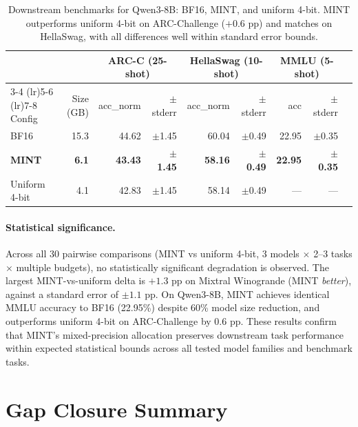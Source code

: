 \documentclass{article}
\begin{document}
\begin{table}[h]
\centering
\small
\caption{Downstream benchmarks for Qwen3-8B: BF16, MINT, and uniform 4-bit. MINT outperforms uniform 4-bit on ARC-Challenge ($+0.6$ pp) and matches on HellaSwag, with all differences well within standard error bounds.}
\label{tab:downstream_qwen8b}
\begin{tabular}{lrrr@{\hskip 6pt}rr@{\hskip 6pt}rr@{\hskip 6pt}r}
\toprule
& & \multicolumn{2}{c}{ARC-C (25-shot)} & \multicolumn{2}{c}{HellaSwag (10-shot)} & \multicolumn{2}{c}{MMLU (5-shot)} \\
\cmidrule(lr){3-4} \cmidrule(lr){5-6} \cmidrule(lr){7-8}
Config & Size (GB) & acc\_norm & $\pm$ stderr & acc\_norm & $\pm$ stderr & acc & $\pm$ stderr \\
\midrule
BF16 & 15.3 & 44.62 & $\pm$1.45 & 60.04 & $\pm$0.49 & 22.95 & $\pm$0.35 \\
\textbf{MINT} & \textbf{6.1} & \textbf{43.43} & $\pm$\textbf{1.45} & \textbf{58.16} & $\pm$\textbf{0.49} & \textbf{22.95} & $\pm$\textbf{0.35} \\
Uniform 4-bit & 4.1 & 42.83 & $\pm$1.45 & 58.14 & $\pm$0.49 & --- & --- \\
\bottomrule
\end{tabular}
\end{table}

\paragraph{Statistical significance.}
Across all 30 pairwise comparisons (MINT vs uniform 4-bit, 3 models $\times$ 2--3 tasks $\times$ multiple budgets), no statistically significant degradation is observed. The largest MINT-vs-uniform delta is $+1.3$ pp on Mixtral Winogrande (MINT \emph{better}), against a standard error of $\pm 1.1$ pp. On Qwen3-8B, MINT achieves identical MMLU accuracy to BF16 (22.95\%) despite 60\% model size reduction, and outperforms uniform 4-bit on ARC-Challenge by 0.6 pp. These results confirm that MINT's mixed-precision allocation preserves downstream task performance within expected statistical bounds across all tested model families and benchmark tasks.

\section{Gap Closure Summary}
\label{app:gap_closure}
\end{document}

